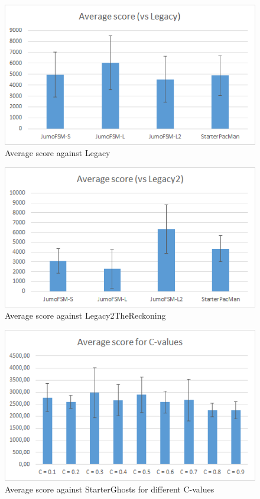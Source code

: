 \documentclass[conference]{IEEEtran}
\begin{document}
\begin{figure}[htp]
\centerline{\includegraphics[width=0.9\columnwidth]{average_legacy.png}}
\caption{Average score against Legacy}
\label{fig-avgl}
\end{figure}

\begin{figure}[htp]
\centerline{\includegraphics[width=0.9\columnwidth]{average_legacy2.png}}
\caption{Average score against Legacy2TheReckoning}
\label{fig-avgl2}
\end{figure}

\begin{figure}[htp]
\centerline{\includegraphics[width=0.9\columnwidth]{c_values.png}}
\caption{Average score against StarterGhosts for different C-values}
\label{fig-cvals}
\end{figure}
\end{document}
